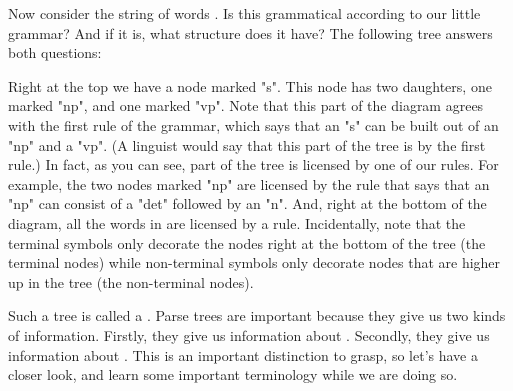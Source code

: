 Now consider the string of words .  Is
this grammatical according to our little grammar?  And if it is, what
structure does it have?  The following tree answers both questions:

\begin{quote}
    { 
             {
                     {}
                     {}}
             {
                     {}
                     {
                             {}
                             {}}}}
\end{quote}



Right at the top we have a node marked "s". This node has two
daughters, one marked "np", and one marked "vp". Note that
this part of the diagram agrees with the first rule of the grammar,
which says that an "s" can be built out of an "np" and a
"vp". (A linguist would say that this part of the tree is
 by the first rule.)  In fact, as you can see,
 part of the tree is licensed by one of our rules.  For
example, the two nodes marked "np" are licensed by the rule that
says that an "np" can consist of a "det" followed by an
"n". And, right at the bottom of the diagram, all the words in
 are licensed by a rule. Incidentally, note
that the terminal symbols only decorate the nodes right at the bottom
of the tree (the terminal nodes) while non-terminal symbols only
decorate nodes that are higher up in the tree (the non-terminal
nodes).

\clearpage
Such a tree is called a . Parse trees are important
because they give us two kinds of information.  Firstly, they give us
information about . Secondly, they give us information
about . This is an important distinction to grasp,
so let's have a closer look, and learn some important terminology
while we are doing so.

